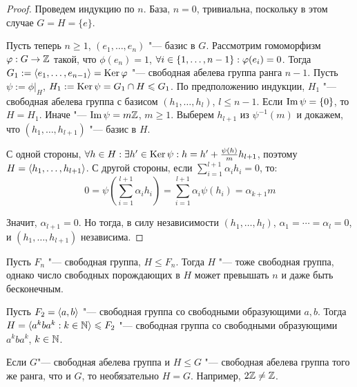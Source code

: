 \begin{proof}
	Проведем индукцию по $n$. База, $n = 0$, тривиальна, поскольку в этом случае $G = H =  \{e\}$.
	
	Пусть теперь $n \ge 1$, $(e_1, \dotsc, e_n)$ "--- базис в $G$. Рассмотрим гомоморфизм $\varphi: G \to \mathbb{Z}$ такой, что $\phi(e_n) = 1$, $\forall i \hm\in \{1, \dotsc, n - 1\}: \phi(e_i) = 0$. Тогда $G_1 \hm{:=} \gl e_1, \dotsc, e_{n - 1} \gr = \ke\phi$ "--- свободная абелева группа ранга $n - 1$. Пусть $\psi := \phi|_H$, $H_1 \hm{:=} \ke\psi \hm= G_1 \cap H \le G_1$. По предположению индукции, $H_1$ "--- свободная абелева группа с базисом $(h_1, \dotsc, h_l)$, $l \le n - 1$. Если $\operatorname{Im}\psi = \{0\}$, то $H = H_1$. Иначе "--- $\operatorname{Im}\psi = m\mathbb{Z}$, $m \ge 1$. Выберем $h_{l + 1}$ из $\psi^{-1}(m)$ и докажем, что $(h_1, \dotsc, h_{l + 1})$ "--- базис в $H$.
	
	С одной стороны, $\forall h \in H: \exists h' \in \ke\psi: h = h' \hm+ \frac{\psi(h)}{m}h_{l + 1}$, поэтому $H \hm= \gl h_1, \dotsc, h_{l + 1} \gr$. С другой стороны, если $\sum_{i = 1}^{l + 1}\alpha_ih_i = 0$, то:
	\[0 = \psi\left(\sum_{i = 1}^{l + 1}\alpha_ih_i\right) = \sum_{i = 1}^{l+1}\alpha_i\psi(h_i) = \alpha_{k+1}m\]
	
	Значит, $\alpha_{l + 1} = 0$. Но тогда, в силу независимости $(h_1, \dotsc, h_l)$, $\alpha_1 = \dotsb = \alpha_l = 0$, и $(h_1, \dotsc, h_{l+1})$ независима.
\end{proof}

\begin{note}
	Пусть $F_n$ "--- свободная группа,  $H \le F_n$. Тогда $H$ "--- тоже свободная группа, однако число свободных порождающих в $H$ может превышать $n$ и даже быть бесконечным.
\end{note}

\begin{example}
	Пусть $F_2 = \langle a, b \rangle$ "--- свободная группа со свободными образующими $a, b$. Тогда $H = \langle a^kba^k : k \in \mathbb{N} \rangle \leqslant F_2$ "--- свободная группа со свободными образующими $a^kba^k$, $k \in \mathbb{N}$.
\end{example}

\begin{note}
	Если $G$"--- свободная абелева группа и $H \le G$ "--- свободная абелева группа того же ранга, что и $G$, то необязательно $H = G$. Например, $2\mathbb{Z} \ne \mathbb{Z}$.
\end{note}

